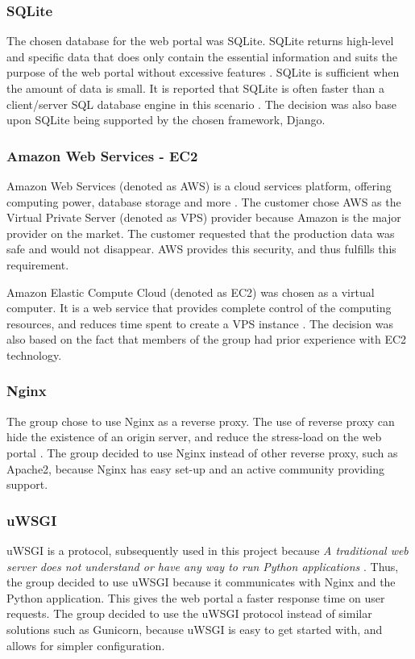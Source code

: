 \subsubsection{SQLite}
The chosen database for the web portal was SQLite. SQLite returns high-level and specific data that does only contain the essential information and suits the purpose of the web portal without excessive features \cite{SQLite}. SQLite is sufficient when the amount of data is small. It is reported that SQLite is often faster than a client/server SQL database engine in this scenario \cite{Server-sideDatabase}. The decision was also base upon SQLite being supported by the chosen framework, Django. 

\subsubsection{Amazon Web Services - EC2}
Amazon Web Services (denoted as AWS) is a cloud services platform, offering computing power, database storage and more \cite{AWS}. The customer chose AWS as the Virtual Private Server (denoted as VPS) provider because Amazon is the major provider on the market. The customer requested that the production data was safe and would not disappear. AWS provides this security, and thus fulfills this requirement.

Amazon Elastic Compute Cloud (denoted as EC2) was chosen as a virtual computer. It is a web service that provides complete control of the computing resources, and reduces time spent to create a VPS instance \cite{EC2}. The decision was also based on the fact that members of the group had prior experience with EC2 technology. 

\subsubsection{Nginx}
The group chose to use Nginx as a reverse proxy. The use of reverse proxy can hide the existence of an origin server, and reduce the stress-load on the web portal \cite{nginx}. The group decided to use Nginx instead of other reverse proxy, such as Apache2, because Nginx has easy set-up and an active community providing support.

\subsubsection{uWSGI}
uWSGI is a protocol, subsequently used in this project because \textit{A traditional web server does not understand or have any way to run Python applications} \cite{whyUseWSGI}. Thus, the group decided to use uWSGI because it communicates with Nginx and the Python application. This gives the web portal a faster response time on user requests. The group decided to use the uWSGI protocol instead of similar solutions such as Gunicorn, because uWSGI is easy to get started with, and allows for simpler configuration.

\cleardoublepage